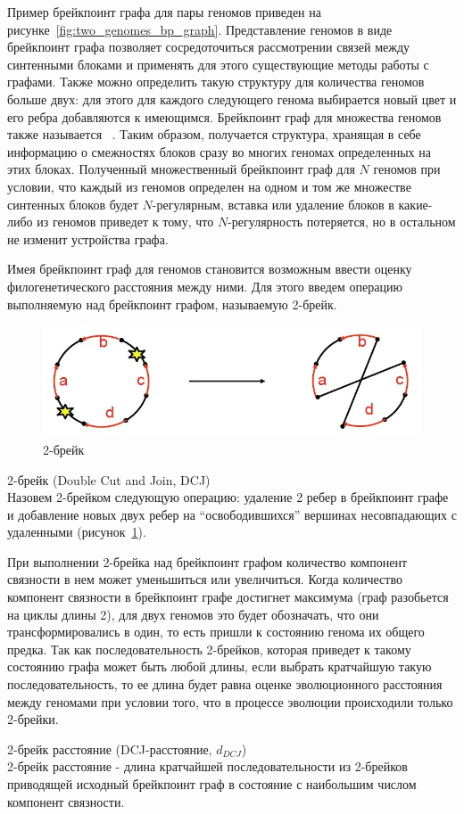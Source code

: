 Пример брейкпоинт графа для пары геномов приведен на рисунке~\ref{fig:two_genomes_bp_graph}.
Представление геномов в виде брейкпоинт графа позволяет сосредоточиться рассмотрении связей между синтенными блоками
и применять для этого существующие методы работы с графами.
Также можно определить такую структуру для количества геномов больше двух:
для этого для каждого следующего генома выбирается новый цвет и его ребра добавляются к имеющимся.
Брейкпоинт граф для множества геномов также называется ~\cite{caprara1999tightness}.
Таким образом, получается структура, хранящая в себе информацию о смежностях блоков сразу во многих геномах определенных на этих блоках.
Полученный множественный брейкпоинт граф для $N$ геномов при условии, что каждый из геномов определен на одном и том же множестве синтенных блоков
будет $N$-регулярным, вставка или удаление блоков в какие-либо из геномов приведет к тому, что $N$-регулярность потеряется,
но в остальном не изменит устройства графа.

Имея брейкпоинт граф для геномов становится возможным ввести оценку филогенетического расстояния между ними.
Для этого введем операцию выполняемую над брейкпоинт графом, называемую 2-брейк.
\begin{figure}[H]
  \centering
  \includegraphics[max width=0.5\linewidth]{fig/1/2break.jpg}
  \caption{2-брейк}
  \label{fig:2break}
\end{figure}
\begin{define}{2-брейк (Double Cut and Join, DCJ)}~\cite{bergeron2006unifying} \\
  Назовем 2-брейком следующую операцию: удаление 2 ребер в брейкпоинт графе и добавление новых двух ребер на ``освободившихся'' вершинах
  несовпадающих с удаленными (рисунок~\ref{fig:2break}).
\end{define}
При выполнении 2-брейка над брейкпоинт графом количество компонент связности в нем может уменьшиться или увеличиться.
Когда количество компонент связности в брейкпоинт графе достигнет максимума (граф разобьется на циклы длины 2),
для двух геномов это будет обозначать, что они трансформировались в один, то есть пришли к состоянию генома их общего предка.
Так как последовательность 2-брейков, которая приведет к такому состоянию графа может быть любой длины, если выбрать кратчайшую такую последовательность,
то ее длина будет равна оценке эволюционного расстояния между геномами при условии того, что в процессе эволюции происходили только 2-брейки.
\begin{define}{2-брейк расстояние (DCJ-расстояние, $d_{DCJ}$)} \\
  2-брейк расстояние - длина кратчайшей последовательности из 2-брейков приводящей
  исходный брейкпоинт граф в состояние с наибольшим числом компонент связности.
\end{define}

